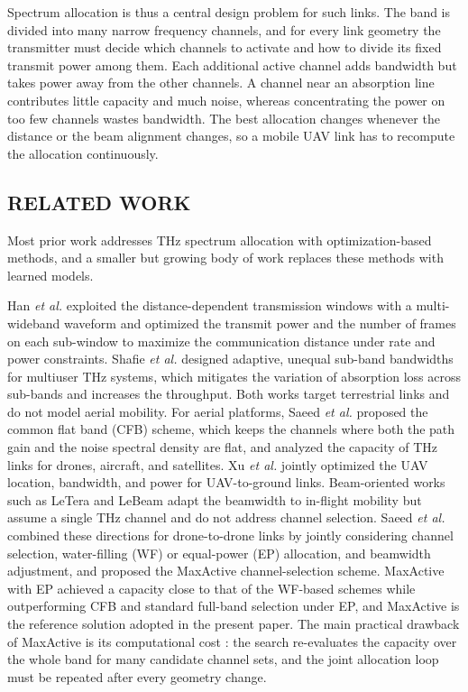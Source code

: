 \documentclass{ieee-ojvt}
\begin{document}
Spectrum allocation is thus a central design problem for such links. The band is
divided into many narrow frequency channels, and for every link geometry the transmitter
must decide which channels to activate and how to divide its fixed transmit power among
them. Each additional active channel adds bandwidth but takes power away from the other
channels. A channel near an absorption line contributes little capacity and much noise,
whereas concentrating the power on too few channels wastes bandwidth. The best
allocation changes whenever the distance or the beam alignment changes, so a mobile UAV
link has to recompute the allocation continuously.

\subsection{RELATED WORK}
\label{sec:related}
Most prior work addresses THz spectrum allocation with optimization-based methods, and a
smaller but growing body of work replaces these methods with learned models.

Han \emph{et al.} \cite{han2016multiwideband} exploited the distance-dependent
transmission windows with a multi-wideband waveform and optimized the transmit power
and the number of frames on each sub-window to maximize the communication distance under
rate and power constraints. Shafie \emph{et al.} \cite{shafie2022subband} designed
adaptive, unequal sub-band bandwidths for multiuser THz systems, which mitigates the
variation of absorption loss across sub-bands and increases the throughput. Both works
target terrestrial links and do not model aerial mobility. For aerial platforms, Saeed
\emph{et al.} \cite{saeed2021cfb} proposed the common flat band (CFB) scheme, which keeps
the channels where both the path gain and the noise spectral density are flat, and
analyzed the capacity of THz links for drones, aircraft, and satellites. Xu \emph{et al.}
\cite{xu2021thzuav} jointly optimized the UAV location, bandwidth, and power for
UAV-to-ground links. Beam-oriented works such as LeTera \cite{moorthy2020letera} and
LeBeam \cite{moorthy2022beam} adapt the beamwidth to in-flight mobility but assume a
single THz channel and do not address channel selection. Saeed \emph{et al.}
\cite{10399804} combined these directions for drone-to-drone links by jointly
considering channel selection, water-filling (WF) or equal-power (EP) allocation, and
beamwidth adjustment, and proposed the MaxActive channel-selection scheme. MaxActive with
EP achieved a capacity close to that of the WF-based schemes while outperforming CFB and
standard full-band selection under EP, and MaxActive is the reference solution adopted
in the present paper. The main practical drawback of MaxActive is its computational cost
\cite{elcik2025d3qn}: the search re-evaluates the capacity over the whole band for many
candidate channel sets, and the joint allocation loop must be repeated after every
geometry change.
\end{document}
